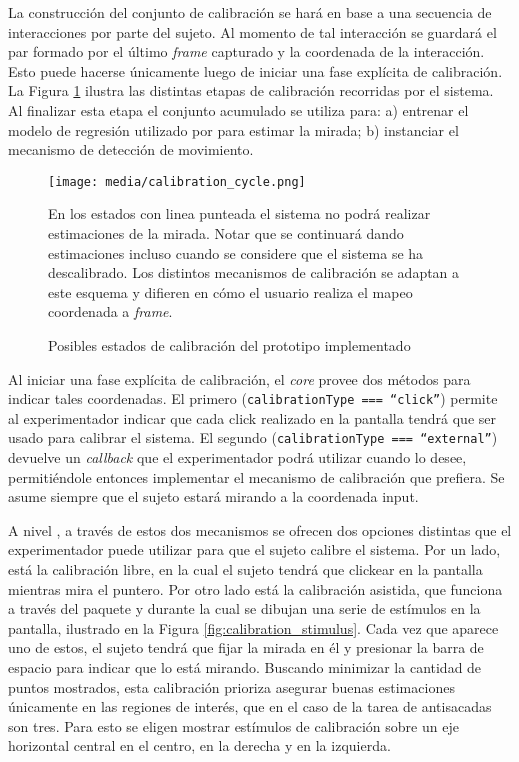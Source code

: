 La construcción del conjunto de calibración se hará en base a una secuencia de
interacciones por parte del sujeto.
Al momento de tal interacción se guardará el par formado por el último
\textit{frame} capturado y la coordenada de la interacción.
Esto puede hacerse únicamente luego de iniciar una fase explícita de
calibración.
La Figura \ref{fig:calibration_cycle} ilustra las distintas etapas de
calibración recorridas por el sistema.
Al finalizar esta etapa el conjunto acumulado se utiliza para: a) entrenar el
modelo de regresión utilizado por \webgazer para estimar la mirada; b)
instanciar el mecanismo de detección de movimiento.

\begin{figure}
    \centering
    \texttt{[image: media/calibration\_cycle.png]}
    \caption{Posibles estados de calibración del prototipo implementado}
    En los estados con linea punteada el sistema no podrá realizar estimaciones
    de la mirada.
    Notar que se continuará dando estimaciones incluso cuando se considere que
    el sistema se ha descalibrado.
    Los distintos mecanismos de calibración se adaptan a este esquema y
    difieren en cómo el usuario realiza el mapeo coordenada a \textit{frame}.
    \label{fig:calibration_cycle}
\end{figure}

Al iniciar una fase explícita de calibración, el \textit{core} provee dos
métodos para indicar tales coordenadas.
El primero (\texttt{calibrationType === “click”}) permite al experimentador
indicar que cada click realizado en la pantalla tendrá que ser usado para
calibrar el sistema.
El segundo (\texttt{calibrationType === “external”}) devuelve un
\textit{callback} que el experimentador podrá utilizar cuando lo desee,
permitiéndole entonces implementar el mecanismo de calibración que prefiera.
Se asume siempre que el sujeto estará mirando a la coordenada input.

A nivel \jspsych, a través de estos dos mecanismos se ofrecen dos opciones
distintas que el experimentador puede utilizar para que el sujeto calibre el
sistema.
Por un lado, está la calibración libre, en la cual el sujeto tendrá que
clickear en la pantalla mientras mira el puntero.
Por otro lado está la calibración asistida, que funciona a través del paquete
\psychophysics [0.2] y durante la cual se dibujan una serie de estímulos en la
pantalla, ilustrado en la Figura \ref{fig:calibration_stimulus}.
Cada vez que aparece uno de estos, el sujeto tendrá que fijar la mirada en él y
presionar la barra de espacio para indicar que lo está mirando.
Buscando minimizar la cantidad de puntos mostrados, esta calibración prioriza
asegurar buenas estimaciones únicamente en las regiones de interés, que en el
caso de la tarea de antisacadas son tres.
Para esto se eligen mostrar estímulos de calibración sobre un eje horizontal
central en el centro, en la derecha y en la izquierda.

